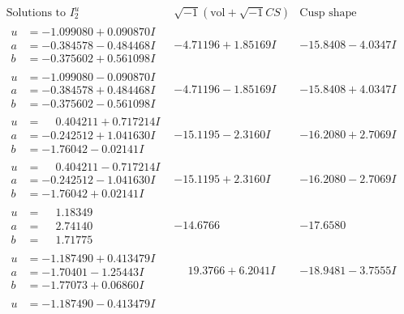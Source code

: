 \documentclass[1p]{elsarticle_modified}
\theoremstyle{definition}
\newcommand{\I}{\sqrt{-1}}
\begin{document}
$$\begin{array}{c|c|c}  
\text{Solutions to }I^u_{2}& \I (\text{vol} + \sqrt{-1}CS) & \text{Cusp shape}\\
 \hline 
\begin{aligned}
u &= -1.099080 + 0.090870 I \\
a &= -0.384578 - 0.484468 I \\
b &= -0.375602 + 0.561098 I\end{aligned}
 & -4.71196 + 1.85169 I & -15.8408 - 4.0347 I \\ \hline\begin{aligned}
u &= -1.099080 - 0.090870 I \\
a &= -0.384578 + 0.484468 I \\
b &= -0.375602 - 0.561098 I\end{aligned}
 & -4.71196 - 1.85169 I & -15.8408 + 4.0347 I \\ \hline\begin{aligned}
u &= \phantom{-}0.404211 + 0.717214 I \\
a &= -0.242512 + 1.041630 I \\
b &= -1.76042 - 0.02141 I\end{aligned}
 & -15.1195 - 2.3160 I & -16.2080 + 2.7069 I \\ \hline\begin{aligned}
u &= \phantom{-}0.404211 - 0.717214 I \\
a &= -0.242512 - 1.041630 I \\
b &= -1.76042 + 0.02141 I\end{aligned}
 & -15.1195 + 2.3160 I & -16.2080 - 2.7069 I \\ \hline\begin{aligned}
u &= \phantom{-}1.18349\phantom{ +0.000000I} \\
a &= \phantom{-}2.74140\phantom{ +0.000000I} \\
b &= \phantom{-}1.71775\phantom{ +0.000000I}\end{aligned}
 & -14.6766\phantom{ +0.000000I} & -17.6580\phantom{ +0.000000I} \\ \hline\begin{aligned}
u &= -1.187490 + 0.413479 I \\
a &= -1.70401 - 1.25443 I \\
b &= -1.77073 + 0.06860 I\end{aligned}
 & \phantom{-}19.3766 + 6.2041 I & -18.9481 - 3.7555 I \\ \hline\begin{aligned}
u &= -1.187490 - 0.413479 I \\

\end{aligned}
\end{array}$$
\end{document}
